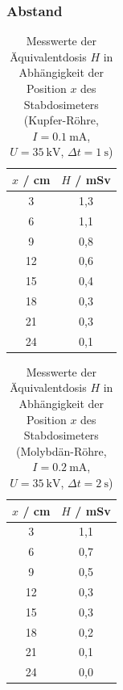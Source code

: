 \documentclass{article}
\begin{document}
\subsubsection{Abstand}

\begin{table}[H]
    \centering
    \caption{Messwerte der Äquivalentdosis $H$ in Abhängigkeit der Position $x$ des Stabdosimeters (Kupfer-Röhre, $I = \SI{0,1}{\milli\ampere}$, $U = \SI{35}{\kilo\volt}$, $\Delta t = \SI{1}{\second}$)}
    \begin{tabular}{|c|c|}
        \hline
        $x$ / \si{\centi\meter} & $H$ / \si{\milli\sievert} \\ \hline \hline
         3 & 1,3 \\ \hline
         6 & 1,1 \\ \hline
         9 & 0,8 \\ \hline
         12 & 0,6 \\ \hline
         15 & 0,4 \\ \hline
         18 & 0,3 \\ \hline
         21 & 0,3 \\ \hline
         24 & 0,1 \\ \hline
    \end{tabular}
    \label{tab:MesswerteAbstand1}
\end{table}

\begin{table}[H]
    \centering
    \caption{Messwerte der Äquivalentdosis $H$ in Abhängigkeit der Position $x$ des Stabdosimeters (Molybdän-Röhre, $I = \SI{0,2}{\milli\ampere}$, $U = \SI{35}{\kilo\volt}$, $\Delta t = \SI{2}{\second}$)}
    \begin{tabular}{|c|c|}
        \hline
        $x$ / \si{\centi\meter} & $H$ / \si{\milli\sievert} \\ \hline \hline
         3 & 1,1 \\ \hline
         6 & 0,7 \\ \hline
         9 & 0,5 \\ \hline
         12 & 0,3 \\ \hline
         15 & 0,3 \\ \hline
         18 & 0,2 \\ \hline
         21 & 0,1 \\ \hline
         24 & 0,0 \\ \hline
    \end{tabular}
    \label{tab:MesswerteAbstand2}
\end{table}
\end{document}
